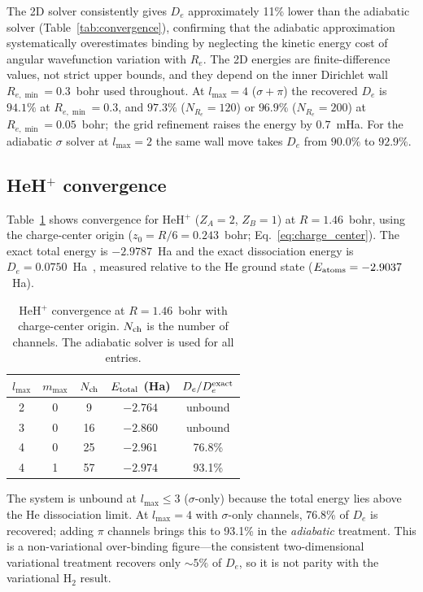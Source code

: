 \documentclass[aps,pra,twocolumn,superscriptaddress,longbibliography]{revtex4-2}
\begin{document}
The 2D solver consistently gives $D_e$ approximately 11\% lower
than the adiabatic solver (Table~\ref{tab:convergence}), confirming
that the adiabatic approximation systematically overestimates binding
by neglecting the kinetic energy cost of angular wavefunction
variation with $R_e$.  The 2D energies are finite-difference values,
not strict upper bounds, and they depend on the inner Dirichlet wall
$R_{e,\min} = 0.3$~bohr used throughout.  At $l_{\max}=4$
($\sigma{+}\pi$) the recovered $D_e$ is $94.1\%$ at
$R_{e,\min} = 0.3$, and $97.3\%$ ($N_{R_e} = 120$) or $96.9\%$
($N_{R_e} = 200$) at $R_{e,\min} = 0.05$~bohr;\ the grid refinement
raises the energy by $0.7$~mHa.  For the adiabatic $\sigma$ solver at
$l_{\max}=2$ the same wall move takes $D_e$ from $90.0\%$ to
$92.9\%$.

\subsection{HeH\texorpdfstring{$^+$}{+} convergence}
\label{sec:heh_results}

Table~\ref{tab:heh_convergence} shows convergence for
HeH$^+$ ($Z_A = 2$, $Z_B = 1$) at $R = 1.46$~bohr,
using the charge-center origin
($z_0 = R/6 = 0.243$~bohr; Eq.~\ref{eq:charge_center}).
The exact total energy is $-2.9787$~Ha and the exact
dissociation energy is $D_e = 0.0750$~Ha~\cite{bishop1977},
measured relative to the He ground state
($E_{\rm atoms} = -2.9037$~Ha).

\begin{table}[h]
\caption{HeH$^+$ convergence at $R = 1.46$~bohr with
charge-center origin.  $N_{\rm ch}$ is the number of channels.
The adiabatic solver is used for all entries.}
\label{tab:heh_convergence}
\begin{ruledtabular}
\begin{tabular}{ccccc}
$l_{\max}$ & $m_{\max}$ & $N_{\rm ch}$ &
  $E_{\rm total}$ (Ha) & $D_e / D_e^{\rm exact}$ \\
\hline
2 & 0 &  9 & $-2.764$ & unbound \\
3 & 0 & 16 & $-2.860$ & unbound \\
4 & 0 & 25 & $-2.961$ & 76.8\% \\
4 & 1 & 57 & $-2.974$ & 93.1\% \\
\end{tabular}
\end{ruledtabular}
\end{table}

The system is unbound at $l_{\max} \le 3$ ($\sigma$-only) because
the total energy lies above the He dissociation limit.  At
$l_{\max} = 4$ with $\sigma$-only channels, 76.8\% of $D_e$
is recovered; adding $\pi$ channels brings this to 93.1\% in the
\emph{adiabatic} treatment.  This is a non-variational over-binding
figure---the consistent two-dimensional variational treatment recovers
only $\sim\!5\%$ of $D_e$, so it is not parity with the variational
H$_2$ result.
\end{document}
